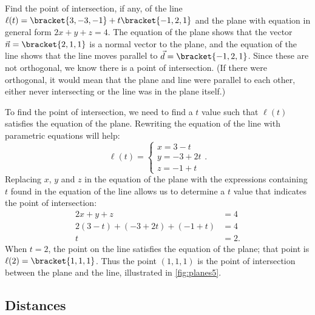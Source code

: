\begin{example}\label{ex_planes5}%
Find the point of intersection, if any, of the line $\ell(t) =\bracket{3,-3,-1}+t\bracket{-1,2,1}$ and the plane with equation in general form $2x+y+z=4$.
\solution
The equation of the plane shows that the vector $\vec n =\bracket{2,1,1}$ is a normal vector to the plane, and the equation of the line shows that the line moves parallel to $\vec d =\bracket{-1,2,1}$. Since these are not orthogonal, we know there is a point of intersection. (If there were orthogonal, it would mean that the plane and line were parallel to each other, either never intersecting or the line was in the plane itself.)

To find the point of intersection, we need to find a $t$ value such that $\ell(t)$ satisfies the equation of the plane. Rewriting the equation of the line with parametric equations will help:
\[\ell(t) = \begin{cases}x=3-t\\y=-3+2t\\z=-1+t\end{cases}.\]%
%
Replacing $x$, $y$ and $z$ in the equation of the plane with the expressions containing $t$ found in the equation of the line allows us to determine a $t$ value that indicates the point of intersection:
\begin{align*}
2x+y+z &=4 \\
2(3-t) + (-3+2t) + (-1+t) &= 4 \\
t&=2.
\end{align*}
When $t=2$, the point on the line satisfies the equation of the plane; that point is $\ell(2) =\bracket{1,1,1}$. Thus the point $(1,1,1)$ is the point of intersection between the plane and the line, illustrated in \autoref{fig:planes5}.
\end{example}

\subsection{Distances}


